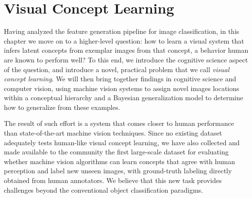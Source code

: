 \chapter{Visual Concept Learning}

Having analyzed the feature generation pipeline for image classification, in this chapter we move on to a higher-level question: how to learn a visual system that infers latent concepts from exemplar images from that concept, a behavior human are known to perform well? To this end, we introduce the cognitive science aspect of the question, and introduce a novel, practical problem that we call \emph{visual concept learning}. We will then bring together findings in cognitive science and computer vision, using machine vision systems to assign novel images locations within a conceptual hierarchy and a Bayesian generalization model to determine how to generalize from these examples.

The result of such effort is a system that comes closer to human performance than state-of-the-art machine vision techniques. Since no existing dataset adequately tests human-like visual concept learning, we have also collected and made available to the community the first large-scale dataset for evaluating whether machine vision algorithms can learn concepts that agree with human perception and label new unseen images, with ground-truth labeling directly obtained from human annotators. We believe that this new task provides challenges beyond the conventional object classification paradigms.




